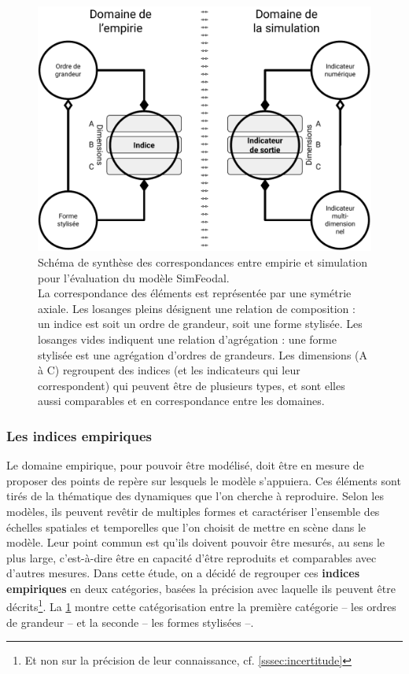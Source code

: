 \begin{figure}[H]
	\captionsetup{width=\linewidth}
	\includegraphics[width=\linewidth]{img/schema_indice_indicateur.pdf}
	\caption{Schéma de synthèse des correspondances entre empirie et simulation pour l'évaluation du modèle SimFeodal.\\
		La correspondance des éléments est représentée par une symétrie axiale.
		Les losanges pleins désignent une relation de composition : un indice est soit un ordre de grandeur, soit une forme stylisée. Les losanges vides indiquent une relation d'agrégation : une forme stylisée est une agrégation d'ordres de grandeurs.
		Les dimensions (A à C) regroupent des indices (et les indicateurs qui leur correspondent) qui peuvent être de plusieurs types, et sont elles aussi comparables et en correspondance entre les domaines.
} 
	\label{fig:schema_indices} 
\end{figure}


\subsubsection{Les indices empiriques}

Le domaine empirique, pour pouvoir être modélisé, doit être en mesure de proposer des \og points de repère\fg{} sur lesquels le modèle s'appuiera. Ces éléments sont tirés de la thématique des dynamiques que l'on cherche à reproduire. Selon les modèles, ils peuvent revêtir de multiples formes et caractériser l'ensemble des échelles spatiales et temporelles que l'on choisit de mettre en scène dans le modèle. Leur point commun est qu'ils doivent pouvoir être mesurés, au sens le plus large, c'est-à-dire être en capacité d'être reproduits et comparables avec d'autres mesures. Dans cette étude, on a décidé de regrouper ces \textbf{indices empiriques} en deux catégories, basées la précision avec laquelle ils peuvent être décrits\footnote{Et non sur la précision de leur connaissance, cf. \cref{sssec:incertitude}}. La \cref{fig:schema_indices} montre cette catégorisation entre la première catégorie -- les ordres de grandeur -- et la seconde -- les formes stylisées --.

